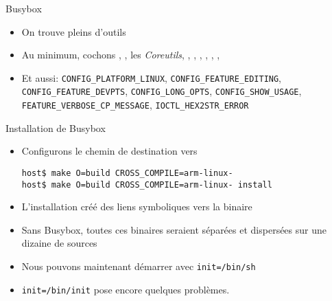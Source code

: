 \begin{frame}[fragile=singleslide]{Busybox}
  \begin{itemize}
  \item On trouve pleins d'outils
  \item    Au   minimum,    cochons    ,   ,    les
    \emph{Coreutils},    ,   ,   ,
    , , , 
  \item         Et         aussi:        \verb+CONFIG_PLATFORM_LINUX+,
    \verb+CONFIG_FEATURE_EDITING+,        \verb+CONFIG_FEATURE_DEVPTS+,
    \verb+CONFIG_LONG_OPTS+,                  \verb+CONFIG_SHOW_USAGE+,
    \verb+FEATURE_VERBOSE_CP_MESSAGE+, \verb+IOCTL_HEX2STR_ERROR+
  \end{itemize}
\end{frame}

\begin{frame}[fragile=singleslide]{Installation de Busybox}
  \begin{itemize}
  \item Configurons le chemin de destination vers 
    \begin{lstlisting}
host$ make O=build CROSS_COMPILE=arm-linux-
host$ make O=build CROSS_COMPILE=arm-linux- install
    \end{lstlisting}
  \item  L'installation créé  des  liens symboliques  vers la  binaire
  \item  Sans  Busybox,  toutes  ces  binaires  seraient  séparées  et
    dispersées sur une dizaine de sources
  \item Nous pouvons maintenant démarrer avec \verb+init=/bin/sh+
  \item \verb+init=/bin/init+ pose encore quelques problèmes.
  \end{itemize}
\end{frame}

